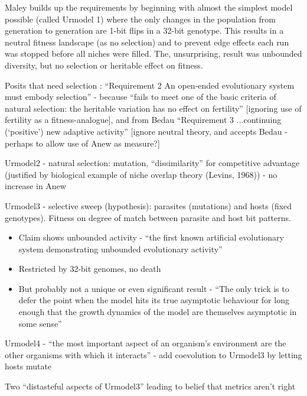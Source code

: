 Maley builds up the requirements by beginning with almost the simplest model possible (called Urmodel 1) where the only changes in the population from generation to generation are 1-bit flips in a 32-bit genotype. This results in a neutral fitness landscape (as no selection) and to prevent edge effects each run was stopped before all niches were filled. The, unsurprising, result was unbounded diversity, but no selection or heritable effect on fitness.

Posits that need selection : ``Requirement 2 An open-ended
evolutionary system must embody selection'' - because ``fails to meet
one of the basic criteria of natural selection: the heritable
variation has no effect on fertility'' {[}ignoring use of fertility as
a fitness-analogue{]}, and from Bedau ``Requirement 3 ...continuing
(`positive') new adaptive activity'' {[}ignore neutral theory, and
accepts Bedau - perhaps to allow use of Anew as measure?{]}

Urmodel2 - natural selection: mutation, ``dissimilarity'' for
competitive advantage (justified by biological example of niche
overlap theory (Levins, 1968)) - no increase in Anew

Urmodel3 - selective sweep (hypothesis): parasites (mutations) and
hosts (fixed genotypes). Fitness on degree of match between parasite
and host bit patterns.

\begin{itemize}
	\item
	
	Claim shows unbounded activity - ``the first known artificial
	evolutionary system demonstrating unbounded evolutionary activity''
	
	\item
	
	Restricted by 32-bit genomes, no death
	
	\item
	
	But probably not a unique or even significant result - ``The only
	trick is to defer the point when the model hits its true asymptotic
	behaviour for long enough that the growth dynamics of the model are
	themselves asymptotic in some sense''
	
\end{itemize}

Urmodel4 - ``the most important aspect of an organism's environment
are the other organisms with which it interacts'' - add coevolution to
Urmodel3 by letting hosts mutate

Two ``distasteful aspects of Urmodel3'' leading to belief that metrics
aren't right

